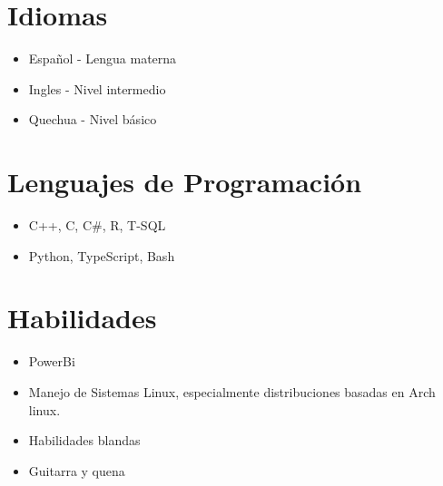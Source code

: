 \documentclass{article}
\begin{document}
\section*{Idiomas}
\begin{itemize}
    \item Español - Lengua materna 
    \item Ingles - Nivel intermedio 
    \item Quechua - Nivel básico
\end{itemize}

\section*{Lenguajes de Programación}
\begin{itemize}
    \item C++, C, C\#, R, T-SQL
    \item Python, TypeScript, Bash
\end{itemize}

\section*{Habilidades}
\begin{itemize}
    \item PowerBi
    \item Manejo de Sistemas Linux, especialmente distribuciones basadas en Arch linux.
    \item Habilidades blandas
    \item Guitarra y quena
\end{itemize}
\end{document}
